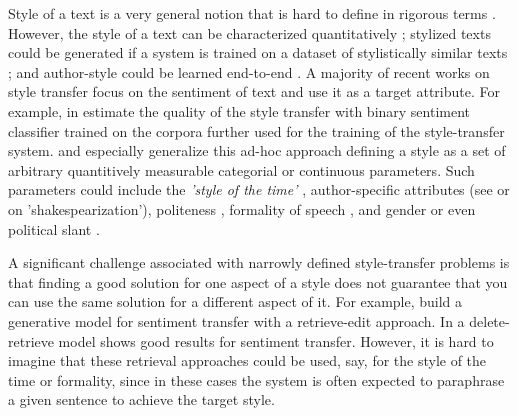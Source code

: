 \documentclass[11pt,a4paper]{article}
\begin{document}
Style of a text is a very general notion that is hard to define in rigorous terms \cite{Xu3}. However, the style of a text can be characterized quantitatively \cite{Hughes}; stylized texts could be generated if a system is trained on a dataset of stylistically similar texts \cite{Potash}; and author-style could be learned end-to-end \cite{TY, TYwilde, Vechtomova}. A majority of recent works on style transfer focus on the sentiment of text and use it as a target attribute. For example, in \cite{li, Kabbara, Xu2} estimate the quality of the style transfer with binary sentiment classifier trained on the corpora further used for the training of the style-transfer system. \cite{Ficler} and especially \cite{fu2} generalize this ad-hoc approach defining a style as a set of arbitrary quantitively measurable categorial or continuous parameters. Such parameters could include the \textit{'style of the time'} \cite{Hughes}, author-specific attributes (see \cite{xu} or \cite{Jhamtani} on 'shakespearization'), politeness \cite{Sennrich}, formality of speech \cite{Rao}, and gender or even political slant \cite{Prabhumoye}. 


A significant challenge associated with narrowly defined style-transfer problems is that finding a good solution for one aspect of a style does not guarantee that you can use the same solution for a different aspect of it. For example,  \citet{guu} build a generative model for sentiment transfer with a retrieve-edit approach. In \cite{li} a delete-retrieve model shows good results for sentiment transfer. However, it is hard to imagine that these retrieval approaches could be used, say, for the style of the time or formality, since in these cases the system is often expected to paraphrase a given sentence to achieve the target style. 
\end{document}
